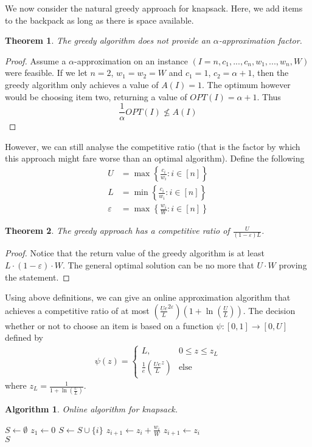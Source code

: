 \documentclass[a4paper, 12pt]{article}
\newtheorem{theorem}{Theorem}[section]
\newtheorem{alg}{Algorithm}[section]
\begin{document}
	We now consider the natural greedy approach for knapsack. Here, we add items to the backpack as long as there is space available. 
	\begin{theorem}
		The greedy algorithm does not provide an $\alpha$-approximation factor.
	\end{theorem}
	\begin{proof}
		Assume a $\alpha$-approximation on an instance $(I = n, c_1,...,c_n,w_1,...,w_n, W)$ were feasible. If we let $n=2$, $w_1=w_2=W$ and $c_1 = 1$, $c_2 = \alpha + 1$, then the greedy algorithm only achieves a value of $A(I) = 1$. The optimum however would be choosing item two, returning a value of $OPT(I) = \alpha + 1$. Thus \[\frac{1}{\alpha}OPT(I) \not\leq A(I)\]
	\end{proof}
	However, we can still analyse the competitive ratio (that is the factor by which this approach might fare worse than an optimal algorithm). Define the following \begin{align}
		 U &= \max\left\{\frac{c_i}{w_i}: i \in [n]\right\}\\
		 L &= \min\left\{\frac{c_i}{w_i}: i \in [n]\right\}\\
		 \varepsilon &= \max\left\{\frac{w_i}{W}: i \in [n]\right\}
	\end{align}
	\begin{theorem}
		The greedy approach has a competitive ratio of $\frac{U}{(1-\varepsilon)L}$.
	\end{theorem}
	\begin{proof}
		Notice that the return value of the greedy algorithm is at least $L\cdot(1-\varepsilon)\cdot W$. The general optimal solution can be no more that $U\cdot W$ proving the statement.
	\end{proof}
	Using above definitions, we can give an online approximation algorithm that achieves a competitive ratio of at most $\left(\frac{Ue}{L}^{2\varepsilon}\right)\left(1+\ln \left(\frac{U}{L}\right)\right)$. The decision whether or not to choose an item is based on a function $\psi: [0,1] \to [0,U]$ defined by \begin{align}
		\psi(z) = \begin{cases}
			L, & 0 \leq z \leq z_L\\
			\frac{1}{e}\left(\frac{Ue}{L}^z\right) & \text{else}
		\end{cases}
	\end{align}
	where $z_L = \frac{1}{1+\ln(\frac{U}{L})}$.
	\begin{alg} Online algorithm for knapsack. \normalfont
		\begin{algorithmic}[1]
			\State $S \gets \emptyset$
			\State $z_1 \gets 0$
			\State $S \gets S \cup \{i\}$
			\State $z_{i+1} \gets z_i + \frac{w_i}{W}$
			\Else
			\State $z_{i+1} \gets z_i$
			\EndIf
			\EndFor\\
			\Return $S$
		\end{algorithmic}
	\end{alg}
\end{document}
